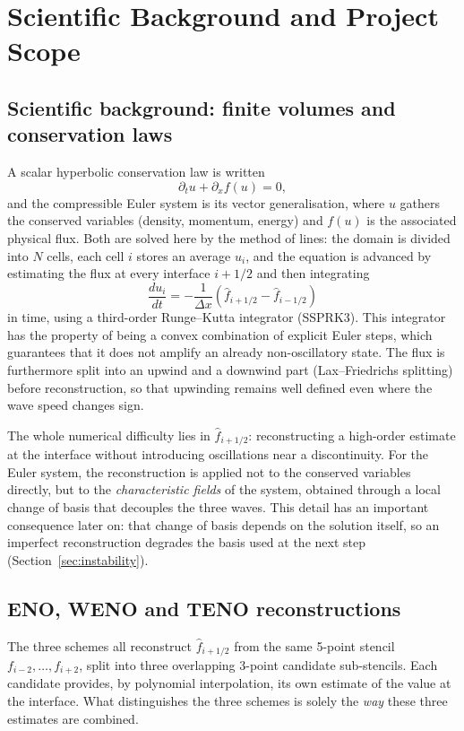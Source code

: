 \documentclass[12pt,a4paper,oneside]{report}
\begin{document}
\chapter{Scientific Background and Project Scope}
\label{chap:context}

\section{Scientific background: finite volumes and conservation laws}
\label{sec:background-fv}

A scalar hyperbolic conservation law is written
\[
\partial_t u + \partial_x f(u) = 0,
\]
and the compressible Euler system is its vector generalisation, where $u$
gathers the conserved variables (density, momentum, energy) and $f(u)$ is the
associated physical flux. Both are solved here by the method of lines: the
domain is divided into $N$ cells, each cell $i$ stores an average $u_i$, and
the equation is advanced by estimating the flux at every interface $i+1/2$ and
then integrating
\[
\frac{d u_i}{dt} = -\frac{1}{\Delta x}\left(\hat f_{i+1/2} - \hat f_{i-1/2}\right)
\]
in time, using a third-order Runge--Kutta integrator (SSPRK3). This integrator
has the property of being a convex combination of explicit Euler steps, which
guarantees that it does not amplify an already non-oscillatory state. The flux
is furthermore split into an upwind and a downwind part (Lax--Friedrichs
splitting) before reconstruction, so that upwinding remains well defined even
where the wave speed changes sign.

The whole numerical difficulty lies in $\hat f_{i+1/2}$: reconstructing a
high-order estimate at the interface without introducing oscillations near a
discontinuity. For the Euler system, the reconstruction is applied not to the
conserved variables directly, but to the \emph{characteristic fields} of the
system, obtained through a local change of basis that decouples the three
waves. This detail has an important consequence later on: that change of basis
depends on the solution itself, so an imperfect reconstruction degrades the
basis used at the next step (Section~\ref{sec:instability}).

\section{ENO, WENO and TENO reconstructions}
\label{sec:background-schemes}

The three schemes all reconstruct $\hat f_{i+1/2}$ from the same 5-point
stencil $f_{i-2},\dots,f_{i+2}$, split into three overlapping 3-point candidate
sub-stencils. Each candidate provides, by polynomial interpolation, its own
estimate of the value at the interface. What distinguishes the three schemes is
solely the \emph{way} these three estimates are combined.
\end{document}
